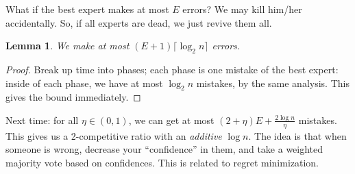 \documentclass[11pt]{article}
\newtheorem{lemma}[theorem]{Lemma}
\begin{document}
What if the best expert makes at most $E$ errors? We may kill him/her accidentally. So, if all experts are dead, we just revive them all.
\begin{lemma}
We make at most $(E+1) \lceil \log_2 n \rceil$ errors.
\end{lemma}
\begin{proof}
Break up time into phases; each phase is one mistake of the best expert: inside of each phase, we have at most $\log_2n$ mistakes, by the same analysis. This gives the bound immediately.
\end{proof}

Next time: for all $\eta \in (0,1)$, we can get at most $(2+\eta) E +\frac{2 \log n}{\eta}$ mistakes. This gives us a 2-competitive ratio with an {\it additive} $\log n$. The idea is that when someone is wrong, decrease your ``confidence'' in them, and take a weighted majority vote based on confidences. This is related to regret minimization.



\end{document}
